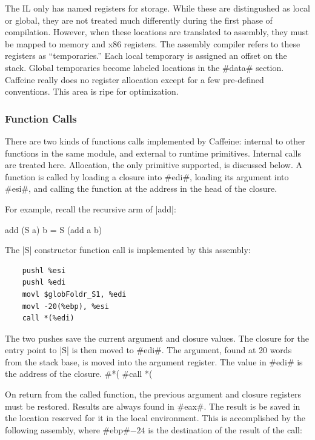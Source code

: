 \documentclass[11pt]{article}
\begin{document}
The IL only has named registers for storage. While these are
distingushed as local or global, they are not treated much differently
during the first phase of compilation. However, when these locations
are translated to assembly, they must be mapped to memory and x86
registers. The assembly compiler refers to these registers as
``temporaries.'' Each local temporary is assigned an offset on the
stack. Global temporaries become labeled locations in the #data#
section. Caffeine really does no register allocation except for a few
pre-defined conventions. This area is ripe for optimization.

\subsubsection{Function Calls}

There are two kinds of functions calls implemented by Caffeine:
internal to other functions in the same module, and external to
runtime primitives. Internal calls are treated here. Allocation, the
only primitive supported, is discussed below. A function is called by
loading a closure into #edi#, loading its argument into #esi#, and
calling the function at the address in the head of the closure. 

For example, recall the recursive arm of |add|:

\begin{code}
  add (S a) b = S (add a b)
\end{code}

\noindent
The |S| constructor function call is implemented by this assembly:

\begin{verbatim}
    pushl %esi
    pushl %edi
    movl $globFoldr_S1, %edi
    movl -20(%ebp), %esi
    call *(%edi)
\end{verbatim}

\noindent
The two pushes save the current argument and closure values. The
closure for the entry point to |S| is then moved to #edi#. The
argument, found at 20 words from the stack base, is moved into the
argument register. The value in #edi# is the address of the
closure. #*(%
#call *(%

On return from the called function, the previous argument and closure
registers must be restored. Results are always found in #eax#. The
result is be saved in the location reserved for it in the
local environment. This is accomplished by the following assembly,
where #ebp#$ - 24$ is the destination of the result of the call:
\end{document}
